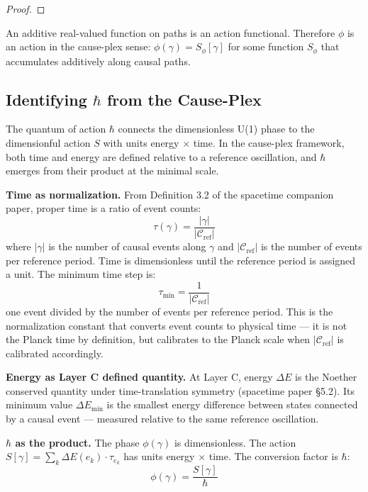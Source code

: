 \documentclass[11pt]{article}
\theoremstyle{definition}
\theoremstyle{remark}
\begin{document}
\begin{proof}
\end{proof}

An additive real-valued function on paths is an action functional.
Therefore \(\phi\) is an action in the cause-plex sense:
\(\phi(\gamma) = S_\phi[\gamma]\) for some function \(S_\phi\) that
accumulates additively along causal paths.

\subsection{\texorpdfstring{Identifying \(\hbar\) from the
Cause-Plex}{Identifying \textbackslash hbar from the Cause-Plex}}\label{identifying-hbar-from-the-cause-plex}

The quantum of action \(\hbar\) connects the dimensionless U(1) phase to
the dimensionful action \(S\) with units energy \(\times\) time. In the
cause-plex framework, both time and energy are defined relative to a
reference oscillation, and \(\hbar\) emerges from their product at the
minimal scale.

\textbf{Time as normalization.} From Definition 3.2 of the spacetime
companion paper, proper time is a ratio of event counts:
\[\tau(\gamma) = \frac{|\gamma|}{|\mathcal{C}_{\text{ref}}|}\] where
\(|\gamma|\) is the number of causal events along \(\gamma\) and
\(|\mathcal{C}_{\text{ref}}|\) is the number of events per reference
period. Time is dimensionless until the reference period is assigned a
unit. The minimum time step is:
\[\tau_{\min} = \frac{1}{|\mathcal{C}_{\text{ref}}|}\] one event divided
by the number of events per reference period. This is the normalization
constant that converts event counts to physical time --- it is not the
Planck time by definition, but calibrates to the Planck scale when
\(|\mathcal{C}_{\text{ref}}|\) is calibrated accordingly.

\textbf{Energy as Layer C defined quantity.} At Layer C, energy
\(\Delta E\) is the Noether conserved quantity under time-translation
symmetry (spacetime paper §5.2). Its minimum value \(\Delta E_{\min}\)
is the smallest energy difference between states connected by a causal
event --- measured relative to the same reference oscillation.

\textbf{\(\hbar\) as the product.} The phase \(\phi(\gamma)\) is
dimensionless. The action
\(S[\gamma] = \sum_k \Delta E(e_k) \cdot \tau_{e_k}\) has units energy
\(\times\) time. The conversion factor is \(\hbar\):
\[\phi(\gamma) = \frac{S[\gamma]}{\hbar}\]
\end{document}
